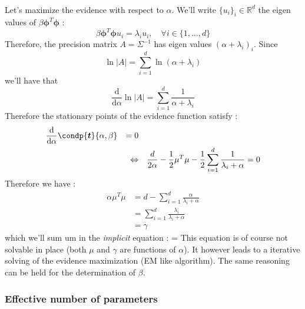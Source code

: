 \documentclass[a4paper]{article}
\newcommand\bt{\boldsymbol{t}}
\newcommand\bphi{\boldsymbol{\phi}}
\begin{document}
{{						\paragraph{} Let's maximize the evidence with respect to $\alpha$. We'll write $\{u_i\}_i\in\mathbb{R}^d$ the eigen values of $\beta \bphi^T\bphi $ : 
				\begin{equation}
					\beta \bphi^T\bphi u_i = \lambda_i u_i,\quad \forall i\in\{1,\hdots,d\}
				\end{equation}
				Therefore, the precision matrix $A = \Sigma^{-1}$ has eigen values $(\alpha + \lambda_i)_i$. Since 
				$$
					\ln{\vert A\vert } = \sum_{i=1}^d \ln{(\alpha+\lambda_i)}
				$$
				we'll have that 
				\begin{equation}
					\frac{\text{d}}{\text{d}\alpha} \ln{\vert A \vert} = \sum_{i=1}^d \frac{1}{\alpha + \lambda_i}
				\end{equation}
				Therefore the stationary points of the evidence function satisfy : 
				\begin{equation}
					\begin{aligned}
						&\frac{\text{d}}{\text{d}\alpha}\condp{\bt}{\alpha,\beta} & = 0 &  &   \\
						& &  \Leftrightarrow & & \frac{d}{2\alpha} - \frac{1}{2}\mu^T\mu - \frac{1}{2}\sum_{i=1}^d \frac{1}{\lambda_i + \alpha}=0
					\end{aligned}
				\end{equation}
				Therefore we have : 
				\begin{equation}
					\begin{aligned}
						\alpha \mu^T\mu &= d - \sum_{i=1}^d \frac{\alpha}{\lambda_i + \alpha}\\
									   &= \sum_{i=1}^d \frac{\lambda_i}{\lambda_i+\alpha} \\
									   &= \gamma
					\end{aligned}
				\end{equation}
				which we'll sum um in the \emph{implicit} equation : 				
				{
					\alpha = 
				}
				This equation is of course not solvable in place (both $\mu$ and $\gamma$ are functions of $\alpha$). It however leads to a iterative solving of the evidence maximization (EM like algorithm). The same reasoning can be held for the determination of $\beta$. 
		}
		\subsubsection{Effective number of parameters}
		{
}}
\end{document}
